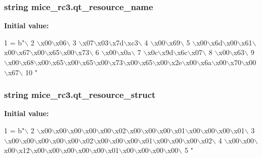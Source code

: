 \subsubsection[{qt\+\_\+resource\+\_\+name}]{\setlength{\rightskip}{0pt plus 5cm}string mice\+\_\+rc3.\+qt\+\_\+resource\+\_\+name}\label{namespacemice__rc3_a6f87ef3c201e44c2bdb970cdb939197e}
{\bfseries Initial value\+:}
\begin{DoxyCode}
1 = b\textcolor{stringliteral}{"\(\backslash\)}
2 \textcolor{stringliteral}{\(\backslash\)x00\(\backslash\)x06\(\backslash\)}
3 \textcolor{stringliteral}{\(\backslash\)x07\(\backslash\)x03\(\backslash\)x7d\(\backslash\)xc3\(\backslash\)}
4 \textcolor{stringliteral}{\(\backslash\)x00\(\backslash\)x69\(\backslash\)}
5 \textcolor{stringliteral}{\(\backslash\)x00\(\backslash\)x6d\(\backslash\)x00\(\backslash\)x61\(\backslash\)x00\(\backslash\)x67\(\backslash\)x00\(\backslash\)x65\(\backslash\)x00\(\backslash\)x73\(\backslash\)}
6 \textcolor{stringliteral}{\(\backslash\)x00\(\backslash\)x0a\(\backslash\)}
7 \textcolor{stringliteral}{\(\backslash\)x0c\(\backslash\)x9d\(\backslash\)x6c\(\backslash\)x07\(\backslash\)}
8 \textcolor{stringliteral}{\(\backslash\)x00\(\backslash\)x63\(\backslash\)}
9 \textcolor{stringliteral}{\(\backslash\)x00\(\backslash\)x68\(\backslash\)x00\(\backslash\)x65\(\backslash\)x00\(\backslash\)x65\(\backslash\)x00\(\backslash\)x73\(\backslash\)x00\(\backslash\)x65\(\backslash\)x00\(\backslash\)x2e\(\backslash\)x00\(\backslash\)x6a\(\backslash\)x00\(\backslash\)x70\(\backslash\)x00\(\backslash\)x67\(\backslash\)}
10 \textcolor{stringliteral}{"}
\end{DoxyCode}
\hypertarget{namespacemice__rc3_af6adb1c88b387f9be600f78d089daf3e}{}
\subsubsection[{qt\+\_\+resource\+\_\+struct}]{\setlength{\rightskip}{0pt plus 5cm}string mice\+\_\+rc3.\+qt\+\_\+resource\+\_\+struct}\label{namespacemice__rc3_af6adb1c88b387f9be600f78d089daf3e}
{\bfseries Initial value\+:}
\begin{DoxyCode}
1 = b\textcolor{stringliteral}{"\(\backslash\)}
2 \textcolor{stringliteral}{\(\backslash\)x00\(\backslash\)x00\(\backslash\)x00\(\backslash\)x00\(\backslash\)x00\(\backslash\)x02\(\backslash\)x00\(\backslash\)x00\(\backslash\)x00\(\backslash\)x01\(\backslash\)x00\(\backslash\)x00\(\backslash\)x00\(\backslash\)x01\(\backslash\)}
3 \textcolor{stringliteral}{\(\backslash\)x00\(\backslash\)x00\(\backslash\)x00\(\backslash\)x00\(\backslash\)x00\(\backslash\)x02\(\backslash\)x00\(\backslash\)x00\(\backslash\)x00\(\backslash\)x01\(\backslash\)x00\(\backslash\)x00\(\backslash\)x00\(\backslash\)x02\(\backslash\)}
4 \textcolor{stringliteral}{\(\backslash\)x00\(\backslash\)x00\(\backslash\)x00\(\backslash\)x12\(\backslash\)x00\(\backslash\)x00\(\backslash\)x00\(\backslash\)x00\(\backslash\)x00\(\backslash\)x01\(\backslash\)x00\(\backslash\)x00\(\backslash\)x00\(\backslash\)x00\(\backslash\)}
5 \textcolor{stringliteral}{"}
\end{DoxyCode}
